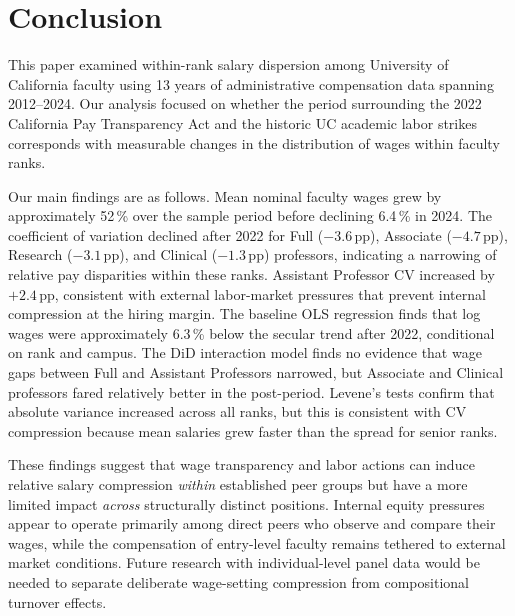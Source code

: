 \documentclass[12pt]{article}
\begin{document}
\section{Conclusion}
\label{sec:conclusion}

This paper examined within-rank salary dispersion among University of
California faculty using 13 years of administrative compensation data
spanning 2012--2024. Our analysis focused on whether the period
surrounding the 2022 California Pay Transparency Act and the historic UC
academic labor strikes corresponds with measurable changes in the
distribution of wages within faculty ranks.

Our main findings are as follows. Mean nominal faculty wages grew by
approximately 52\,\% over the sample period before declining 6.4\,\% in
2024. The coefficient of variation declined after 2022 for Full
($-3.6$\,pp), Associate ($-4.7$\,pp), Research ($-3.1$\,pp), and
Clinical ($-1.3$\,pp) professors, indicating a narrowing of relative pay
disparities within these ranks. Assistant Professor CV increased by
$+2.4$\,pp, consistent with external labor-market pressures that prevent
internal compression at the hiring margin. The baseline OLS regression
finds that log wages were approximately 6.3\,\% below the secular trend
after 2022, conditional on rank and campus. The DiD interaction model
finds no evidence that wage gaps between Full and Assistant Professors
narrowed, but Associate and Clinical professors fared relatively better
in the post-period. Levene's tests confirm that absolute variance
increased across all ranks, but this is consistent with CV compression
because mean salaries grew faster than the spread for senior ranks.

These findings suggest that wage transparency and labor actions can
induce relative salary compression \emph{within} established peer groups
but have a more limited impact \emph{across} structurally distinct
positions. Internal equity pressures appear to operate primarily among
direct peers who observe and compare their wages, while the
compensation of entry-level faculty remains tethered to external market
conditions. Future research with individual-level panel data would be
needed to separate deliberate wage-setting compression from compositional
turnover effects.
\end{document}
